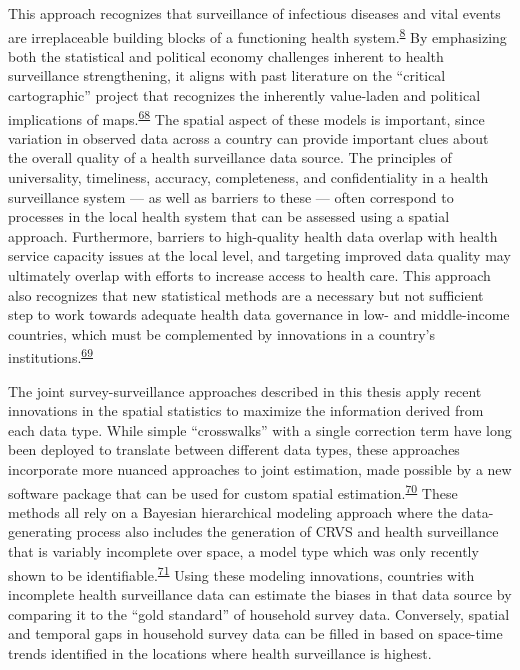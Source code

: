 \documentclass[
]{article}
\begin{document}
This approach recognizes that surveillance of infectious diseases and vital events are irreplaceable building blocks of a functioning health system.\textsuperscript{\protect\hyperlink{ref-Roberts2008}{8}} By emphasizing both the statistical and political economy challenges inherent to health surveillance strengthening, it aligns with past literature on the ``critical cartographic'' project that recognizes the inherently value-laden and political implications of maps.\textsuperscript{\protect\hyperlink{ref-Crampton2006}{68}} The spatial aspect of these models is important, since variation in observed data across a country can provide important clues about the overall quality of a health surveillance data source. The principles of universality, timeliness, accuracy, completeness, and confidentiality in a health surveillance system --- as well as barriers to these --- often correspond to processes in the local health system that can be assessed using a spatial approach. Furthermore, barriers to high-quality health data overlap with health service capacity issues at the local level, and targeting improved data quality may ultimately overlap with efforts to increase access to health care. This approach also recognizes that new statistical methods are a necessary but not sufficient step to work towards adequate health data governance in low- and middle-income countries, which must be complemented by innovations in a country's institutions.\textsuperscript{\protect\hyperlink{ref-Tiffin2019}{69}}

The joint survey-surveillance approaches described in this thesis apply recent innovations in the spatial statistics to maximize the information derived from each data type. While simple ``crosswalks'' with a single correction term have long been deployed to translate between different data types, these approaches incorporate more nuanced approaches to joint estimation, made possible by a new software package that can be used for custom spatial estimation.\textsuperscript{\protect\hyperlink{ref-Osgood-Zimmerman2021}{70}} These methods all rely on a Bayesian hierarchical modeling approach where the data-generating process also includes the generation of CRVS and health surveillance that is variably incomplete over space, a model type which was only recently shown to be identifiable.\textsuperscript{\protect\hyperlink{ref-Schmertmann2018}{71}} Using these modeling innovations, countries with incomplete health surveillance data can estimate the biases in that data source by comparing it to the ``gold standard'' of household survey data. Conversely, spatial and temporal gaps in household survey data can be filled in based on space-time trends identified in the locations where health surveillance is highest.
\end{document}
